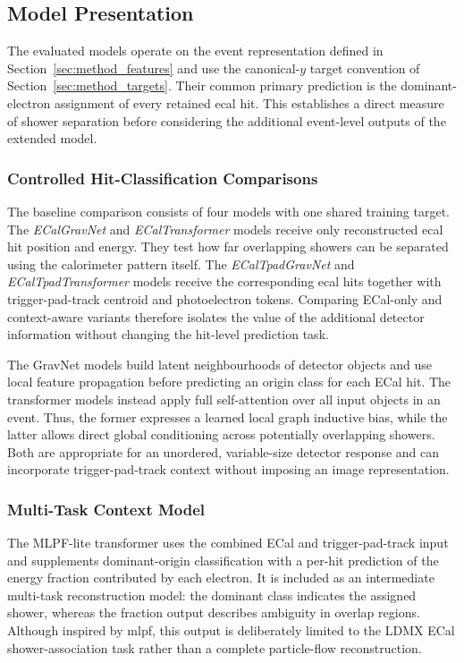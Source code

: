 
\subsection{Model Presentation}
\label{sec:results_model_presentation}

The evaluated models operate on the event representation defined in
Section~\ref{sec:method_features} and use the canonical-\(y\) target
convention of Section~\ref{sec:method_targets}. Their common primary
prediction is the dominant-electron assignment of every retained
\gls{ecal} hit. This establishes a direct measure of shower separation before
considering the additional event-level outputs of the extended model.

\subsubsection{Controlled Hit-Classification Comparisons}

The baseline comparison consists of four models with one shared training
target. The \textit{ECalGravNet} and \textit{ECalTransformer} models receive
only reconstructed \gls{ecal} hit position and energy. They test how far
overlapping showers can be separated using the calorimeter pattern itself.
The \textit{ECalTpadGravNet} and \textit{ECalTpadTransformer} models receive
the corresponding \gls{ecal} hits together with trigger-pad-track centroid
and photoelectron tokens. Comparing ECal-only and context-aware variants
therefore isolates the value of the additional detector information without
changing the hit-level prediction task.

The GravNet models build latent neighbourhoods of detector objects and use
local feature propagation before predicting an origin class for each ECal
hit. The transformer models instead apply full self-attention over all input
objects in an event. Thus, the former expresses a learned local graph
inductive bias, while the latter allows direct global conditioning across
potentially overlapping showers. Both are appropriate for an unordered,
variable-size detector response and can incorporate trigger-pad-track
context without imposing an image representation.

\subsubsection{Multi-Task Context Model}

The MLPF-lite transformer uses the combined ECal and trigger-pad-track input
and supplements dominant-origin classification with a per-hit prediction of
the energy fraction contributed by each electron. It is included as an
intermediate multi-task reconstruction model: the dominant class indicates
the assigned shower, whereas the fraction output describes ambiguity in
overlap regions. Although inspired by \gls{mlpf}, this output is deliberately
limited to the LDMX ECal shower-association task rather than a complete
particle-flow reconstruction.

